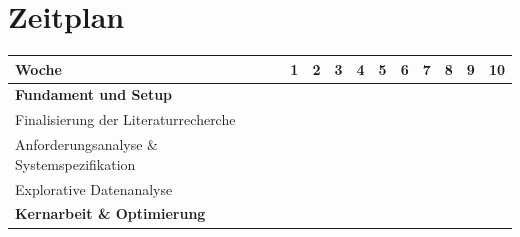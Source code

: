 
\section{Zeitplan}

\begin{center}
    


\begin{tabular}{|l|l|l|l|l|l|l|l|l|l|l|}
\hline
\rowcolor[HTML]{DAE8FC} 
\textbf{Woche}                                             & 1                        & 2                        & 3                        & 4                        & 5                        & 6                        & 7                        & 8                        & 9                        & 10                       \\ \hline
\cellcolor[HTML]{9B9B9B}\textbf{Fundament und Setup}       & \cellcolor[HTML]{9B9B9B} & \cellcolor[HTML]{9B9B9B} & \cellcolor[HTML]{9B9B9B} & \cellcolor[HTML]{FFFFFF} & \cellcolor[HTML]{FFFFFF} &                          &                          &                          &                          &                          \\ \hline
Finalisierung der Literaturrecherche                       & \cellcolor[HTML]{C0C0C0} &                          &                          &                          &                          & \cellcolor[HTML]{FFFFFF} &                          &                          &                          &                          \\ \hline
Anforderungsanalyse \& Systemspezifikation                 &                          & \cellcolor[HTML]{C0C0C0} &                          &                          &                          &                          &                          &                          &                          &                          \\ \hline
Explorative Datenanalyse                                   &                          &                          & \cellcolor[HTML]{C0C0C0} &                          &                          &                          &                          &                          &                          &                          \\ \hline
\cellcolor[HTML]{9B9B9B}\textbf{Kernarbeit \& Optimierung} &                          &                          &                          & \cellcolor[HTML]{9B9B9B} & \cellcolor[HTML]{9B9B9B} & \cellcolor[HTML]{9B9B9B} &  &                          &                          &                          \\ \hline

\end{tabular}
\end{center}
